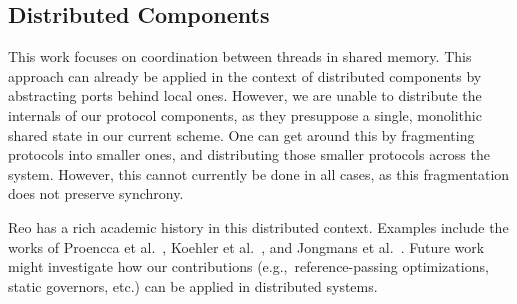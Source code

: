 \subsection{Distributed Components}
This work focuses on coordination between threads in shared memory. This approach can already be applied in the context of distributed components by abstracting ports behind local ones. However, we are unable to distribute the internals of our protocol components, as they presuppose a single, monolithic shared state in our current scheme. One can get around this by fragmenting protocols into smaller ones, and distributing those smaller protocols across the system. However, this cannot currently be done in all cases, as this fragmentation does not preserve synchrony. 

Reo has a rich academic history in this distributed context. Examples include the works of Proencca et al.~\cite{proencca2012dreams}, Koehler et al.~\cite{koehler2008reconfiguring}, and Jongmans et al.~\cite{jongmans2014partially}. Future work might investigate how our contributions (e.g.,\ reference-passing optimizations, static governors, etc.) can be applied in distributed systems.


